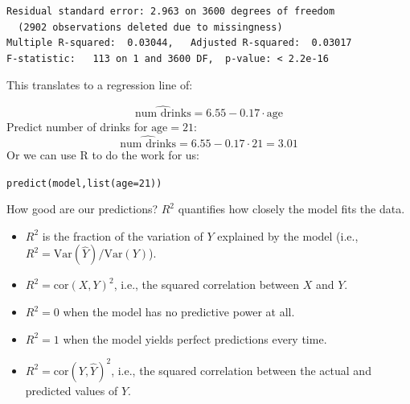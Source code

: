 \documentclass{beamer}\usepackage[]{graphicx}\usepackage[]{color}
\makeatletter
\newcommand{\hlnum}[1]{\textcolor[rgb]{0.824,0.412,0.118}{#1}}%
\newcommand{\hlstd}[1]{\textcolor[rgb]{1,0.894,0.769}{#1}}%
\newcommand{\hlkwc}[1]{\textcolor[rgb]{0.78,0.941,0.545}{#1}}%
\newcommand{\hlkwd}[1]{\textcolor[rgb]{1,0.78,0.769}{#1}}%
\newenvironment{kframe}{%
 \def\at@end@of@kframe{}%
 \ifinner\ifhmode%
  \def\at@end@of@kframe{\end{minipage}}%
  \begin{minipage}{\columnwidth}%
 \fi\fi%
 \def\FrameCommand##1{\hskip\@totalleftmargin \hskip-\fboxsep
 \colorbox{shadecolor}{##1}\hskip-\fboxsep
     \hskip-\linewidth \hskip-\@totalleftmargin \hskip\columnwidth}%
 \MakeFramed {\advance\hsize-\width
   \@totalleftmargin\z@ \linewidth\hsize
   \@setminipage}}%
 {\par\unskip\endMakeFramed%
 \at@end@of@kframe}
\newenvironment{knitrout}{}{} %
\makeatother
\begin{document}
\begin{darkframes}
\begin{frame}[fragile]
\begin{knitrout}
\begin{kframe}
\begin{verbatim}
Residual standard error: 2.963 on 3600 degrees of freedom
  (2902 observations deleted due to missingness)
Multiple R-squared:  0.03044,	Adjusted R-squared:  0.03017 
F-statistic:   113 on 1 and 3600 DF,  p-value: < 2.2e-16
\end{verbatim}
\end{kframe}
\end{knitrout}
      
    \end{frame}

    \begin{frame}[fragile]
      This translates to a regression line of:

      \[
        \widehat{\text{num drinks}} = 6.55 - 0.17 \cdot\text{age}
      \]
      \pause
      Predict number of drinks for $\text{age}=21$:
      \[
        \widehat{\text{num drinks}}
        = 6.55 - 0.17 \cdot 21
        = 3.01
      \]
      Or we can use R to do the work for us:
\begin{knitrout}
\color{fgcolor}\begin{kframe}
\begin{alltt}
\hlkwd{predict}\hlstd{(model,} \hlkwd{list}\hlstd{(}\hlkwc{age}\hlstd{=}\hlnum{21}\hlstd{))}
\end{alltt}
\end{kframe}
\end{knitrout}
      
    \end{frame}

    \begin{frame}{How good are our predictions?}
      $R^2$ quantifies how closely the model fits the data.
      \begin{itemize}[<+->]
        \item $R^2$ is the fraction of the variation of $Y$ explained by the model (i.e., $R^2 = \text{Var}(\hat Y)/\text{Var}(Y)$).
        \item $R^2=\text{cor}(X,Y)^2$, i.e., the squared correlation between $X$ and $Y$.
        \item $R^2=0$ when the model has no predictive power at all.
        \item $R^2=1$ when the model yields perfect predictions every time.
        \item $R^2=\text{cor}(Y,\hat Y)^2$, i.e., the squared correlation between the actual and predicted values of $Y$.
      \end{itemize}
    \end{frame}


\end{darkframes}
\end{document}
